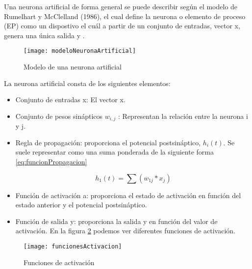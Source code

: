 Una neurona artificial de forma general se puede describir según el modelo de Rumelhart y McClelland (1986), el cual define la neurona o elemento de proceso (EP) como un dispostivo el cuál a partir de un conjunto de entradas, vector x, genera una única salida y \cite{redesNeurnalesUno}. 

\begin{figure}[h]
    \begin{center}%
        \begin{center}%
          \texttt{[image: modeloNeuronaArtificial]}%
          \caption{Modelo de una neurona artificial}%
          \label{figmodeloNeuronaArtificial}%
        \end{center}%
  	\end{center}%
\end{figure}%

\newpage
La neurona artificial consta de los siguientes elementos:

\begin{itemize}
	\item{Conjunto de entradas x}: El vector x.
	\item{Conjunto de pesos sinápticos $w_{i,j}$ }: Representan la relación entre la neurona i y j.
	\item{Regla de propagación}: proporciona el potencial postsináptico, $h_i (t)$. Se suele representar como una suma ponderada de la siguiente forma \ref{eq:funcionPropagacion}
	
\begin{equation} \label{eq:funcionPropagacion}
	h_{1}(t)=\sum (w_{1j}*x_{j})
\end{equation}

	\item{Función de activación a}: proporciona el estado de activación en función del estado anterior y el potencial postsináptico.
	\item{Función de salida y}: proporciona la salida y en función del valor de activación. En la figura \ref{figfuncionesActivacion} podemos ver diferentes funciones de activación.
\end{itemize}

\begin{figure}[h]
    \begin{center}%
        \begin{center}%
          \texttt{[image: funcionesActivacion]}%
          \caption{Funciones de activación}%
          \label{figfuncionesActivacion}%
        \end{center}%
  	\end{center}%
\end{figure}%
\newpage

